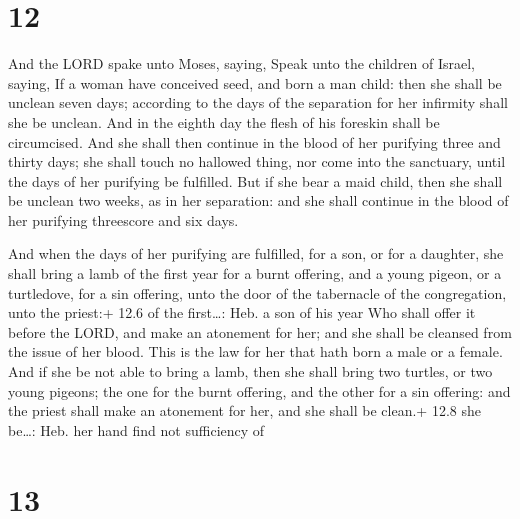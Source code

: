 \hypertarget{section-11}{%
\section{12}\label{section-11}}

 And the LORD spake unto Moses, saying,  Speak
unto the children of Israel, saying, If a woman have conceived seed, and
born a man child: then she shall be unclean seven days; according to the
days of the separation for her infirmity shall she be unclean.
 And in the eighth day the flesh of his foreskin shall be
circumcised.  And she shall then continue in the blood of
her purifying three and thirty days; she shall touch no hallowed thing,
nor come into the sanctuary, until the days of her purifying be
fulfilled.  But if she bear a maid child, then she shall be
unclean two weeks, as in her separation: and she shall continue in the
blood of her purifying threescore and six days.

 And when the days of her purifying are fulfilled, for a
son, or for a daughter, she shall bring a lamb of the first year for a
burnt offering, and a young pigeon, or a turtledove, for a sin offering,
unto the door of the tabernacle of the congregation, unto the priest:+
12.6 of the first\ldots: Heb. a son of his year  Who shall
offer it before the LORD, and make an atonement for her; and she shall
be cleansed from the issue of her blood. This is the law for her that
hath born a male or a female.  And if she be not able to
bring a lamb, then she shall bring two turtles, or two young pigeons;
the one for the burnt offering, and the other for a sin offering: and
the priest shall make an atonement for her, and she shall be clean.+
12.8 she be\ldots: Heb. her hand find not sufficiency of

\hypertarget{section-12}{%
\section{13}\label{section-12}}


